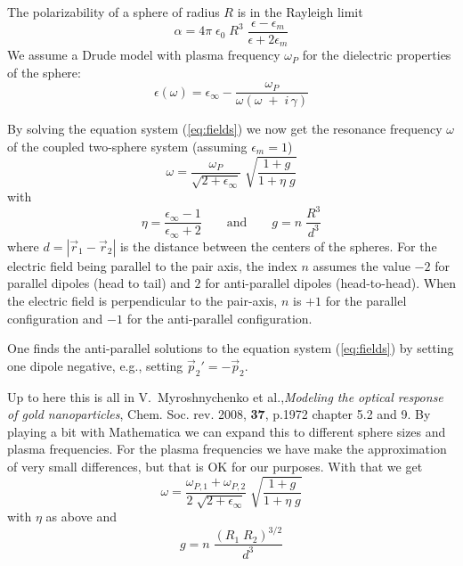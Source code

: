 The polarizability of a sphere of radius $R$ is in the Rayleigh limit
\begin{equation}
 \alpha = 4 \pi \; \epsilon_0  \; R^3 \; \frac{\epsilon - \epsilon_m}{\epsilon +
2 \epsilon_m}
\end{equation}
We assume a Drude model with plasma frequency $\omega_P$ for the dielectric
properties of the sphere:
\begin{equation}
 \epsilon(\omega) = \epsilon_{\infty} - \frac{\omega_P}{ \omega \left(\omega \;
+ \; i\, \gamma \right) }
\end{equation}



By solving the equation system (\ref{eq:fields}) we now get the resonance
frequency $\omega$ of the coupled two-sphere system (assuming $\epsilon_m = 1$)
\begin{equation} \label{eq:omega_equal}
 \omega = \frac{\omega_P}{\sqrt{2 + \epsilon_{\infty}} }  \; \sqrt{ \frac{1 +
g}{ 1 +  \eta \; g}}
\end{equation}
with 
\begin{equation}
 \eta = \frac{\epsilon_{\infty} - 1}{\epsilon_{\infty} + 2 } 
 \qquad \text{and} \qquad
 g = n \; \frac{R^3}{d^3}  
\end{equation}
where $d = \left| \vec{r}_1 -  \vec{r}_2 \right|$ is the distance between the
centers of the spheres.
For the electric field being parallel to the pair axis, the index $n$ assumes
the value $-2$ for parallel dipoles (head to tail) and $2$ for anti-parallel
dipoles (head-to-head). When the electric field is perpendicular to the
pair-axis, $n$ is $+1$ for the parallel configuration and $-1$ for the
anti-parallel configuration.

One finds the anti-parallel solutions to the equation system (\ref{eq:fields})
by setting one dipole negative, e.g., setting $\vec{p}_2' = - \vec{p}_2$.


Up to here this is all in V.~Myroshnychenko et al.,\textit{Modeling the optical
response of gold nanoparticles}, Chem. Soc. rev. 2008, \textbf{37}, p.1972
chapter 5.2 and 9. By playing a bit with Mathematica we can expand this to
different sphere sizes and plasma frequencies. For the plasma frequencies we
have make the approximation of very small differences, but that is OK for our
purposes. With that we get
\begin{equation}\label{eq:omega_diff}
 \omega = \frac{\omega_{P,1} +  \omega_{P,2}}{2 \; \sqrt{2 + \epsilon_{\infty}}
}  \; \sqrt{ \frac{1 +
g}{ 1 +  \eta \; g}}
\end{equation}
with $\eta$ as above and
\begin{equation}
    g = n \; \frac{\left(R_1 \; R_2 \right)^{3/2}}{d^3}  
\end{equation}


